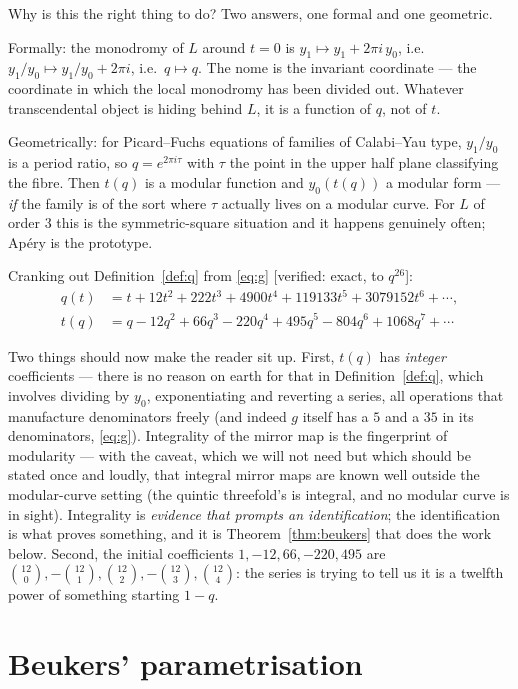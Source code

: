 \documentclass[11pt,reqno]{amsart}
\theoremstyle{plain}
\theoremstyle{definition}
\theoremstyle{remark}
\newcommand{\Ver}[1]{\textup{\textsf{[verified: #1]}}}
\numberwithin{equation}{section}
\begin{document}
Why is this the right thing to do? Two answers, one formal and one geometric.

Formally: the monodromy of $L$ around $t=0$ is $y_1\mapsto y_1+2\pi i\,y_0$,
i.e.\ $y_1/y_0\mapsto y_1/y_0+2\pi i$, i.e.\ $q\mapsto q$. The nome is the
invariant coordinate --- the coordinate in which the local monodromy has been
divided out. Whatever transcendental object is hiding behind $L$, it is a
function of $q$, not of $t$.

Geometrically: for Picard--Fuchs equations of families of Calabi--Yau type,
$y_1/y_0$ is a period ratio, so $q=e^{2\pi i\tau}$ with $\tau$ the point in the
upper half plane classifying the fibre. Then $t(q)$ is a modular function and
$y_0(t(q))$ a modular form --- \emph{if} the family is of the sort where
$\tau$ actually lives on a modular curve. For $L$ of order $3$ this is the
symmetric-square situation and it happens genuinely often; Ap\'ery is the
prototype.

Cranking out Definition~\ref{def:q} from \eqref{eq:g} \Ver{exact, to $q^{26}$}:
\begin{align}
  q(t)&=t+12t^2+222t^3+4900t^4+119133t^5+3079152t^6+\cdots,
    \label{eq:qt}\\
  t(q)&=q-12q^2+66q^3-220q^4+495q^5-804q^6+1068q^7+\cdots
    \label{eq:tq}
\end{align}

Two things should now make the reader sit up. First, $t(q)$ has \emph{integer}
coefficients --- there is no reason on earth for that in
Definition~\ref{def:q}, which involves dividing by $y_0$, exponentiating and
reverting a series, all operations that manufacture denominators freely (and
indeed $g$ itself has a $5$ and a $35$ in its denominators, \eqref{eq:g}).
Integrality of the mirror map is the fingerprint of modularity --- with the
caveat, which we will not need but which should be stated once and loudly, that
integral mirror maps are known well outside the modular-curve setting (the
quintic threefold's is integral, and no modular curve is in sight). Integrality
is \emph{evidence that prompts an identification}; the identification is what
proves something, and it is Theorem~\ref{thm:beukers} that does the work below.
Second, the
initial coefficients $1,-12,66,-220,495$ are $\binom{12}{0},-\binom{12}{1},
\binom{12}{2},-\binom{12}{3},\binom{12}{4}$: the series is trying to tell us it
is a twelfth power of something starting $1-q$.

\section{Beukers' parametrisation}\label{sec:beukers}
\end{document}
